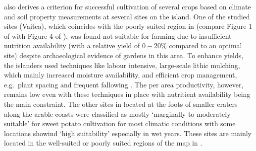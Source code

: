 \citet{Louwagie2006} also derives a criterion for successful cultivation of several crops based on climate and soil property measurements at several sites on the island. 
One of the studied sites (Vaitea), which coincides with the poorly suited region in \citet{Puleston2017} (compare Figure 1 of \citet{Louwagie2006} with Figure 4 of \citet{Puleston2017}), was found not suitable for farming due to insufficient nutrition availability (with a relative yield of $0-20\%$ compared to an optimal site) despite archaeological evidence of gardens in this area.
To enhance yields, the islanders used techniques like labour intensive, large-scale lithic mulching, which mainly increased moisture availability, and efficient crop management, e.g.\ plant spacing and frequent fallowing \citep{Louwagie2006}.
The per area productivity, however, remains low even with these techniques in place with nutritient availability being the main constraint.
The other sites in \citet{Louwagie2006} located at the foots of smaller craters along the arable coasts were classified as mostly `marginally to moderately suitable' for sweet potato cultivation for most climatic conditions with some locations showind `high suitability' especially in wet years. 
These sites are mainly located in the well-suited or poorly suited regions of the map in \citet{Pulestion2017}.

